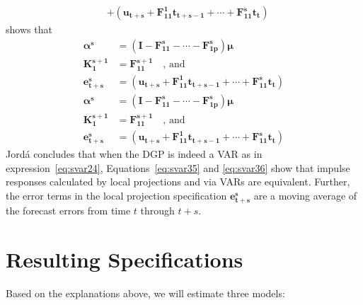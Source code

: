 \documentclass[a4paper,11pt,listof=nochaptergap,oneside,pointednumbers,bibtotoc,bigheadings,liststotoc]{scrbook}
\theoremstyle{mysatz}
\theoremstyle{mydefinition}
\theoremstyle{mybemerkung}
\newcommand{\vect}[1]{\boldsymbol{\mathbf{#1}}}
\begin{document}
\begin{itemize}
\begin{enumerate}
\begin{equation}
\begin{split}
		& + (\vect{u_{t+s}} + \vect{F_{11}^1}\vect{t_{t+s-1}} + \cdots + \vect{F_{11}^s}\vect{t_{t}})
	\end{split}								
	\end{equation}	
	shows that 
			\begin{equation} \label{eq:svar36}
	\begin{split}
		\vect{\alpha^s} & = (\vect{I} - \vect{F_{11}^s} - \cdots - \vect{F_{1p}^s})\vect{\mu} \\
		\vect{K_1^{s+1}} & = \vect{F_{11}^{s+1}} \quad \text{, and} \\
		\vect{e_{t+s}^s} & = (\vect{u_{t+s}} + \vect{F_{11}^1}\vect{t_{t+s-1}} + \cdots + \vect{F_{11}^s}\vect{t_{t}})
	\end{split}								
	\end{equation}	\begin{equation} \label{eq:svar36}
	\begin{split}
		\vect{\alpha^s} & = (\vect{I} - \vect{F_{11}^s} - \cdots - \vect{F_{1p}^s})\vect{\mu} \\
		\vect{K_1^{s+1}} & = \vect{F_{11}^{s+1}} \quad \text{, and} \\
		\vect{e_{t+s}^s} & = (\vect{u_{t+s}} + \vect{F_{11}^1}\vect{t_{t+s-1}} + \cdots + \vect{F_{11}^s}\vect{t_{t}})
	\end{split}								
	\end{equation}	
	Jordá concludes that when the DGP is indeed a VAR as in expression~\ref{eq:svar24}, Equations~\ref{eq:svar35} and \ref{eq:svar36} show that impulse responses calculated by local projections and via VARs are equivalent. Further, the error terms in the local projection specification $\vect{e_{t+s}^s}$ are a moving average of the forecast errors from time $t$ through $t+s$.
\end{enumerate}

\section{Resulting Specifications}
Based on the explanations above, we will estimate three models:
\begin{enumerate}


\end{enumerate}
\end{itemize}
\end{document}
